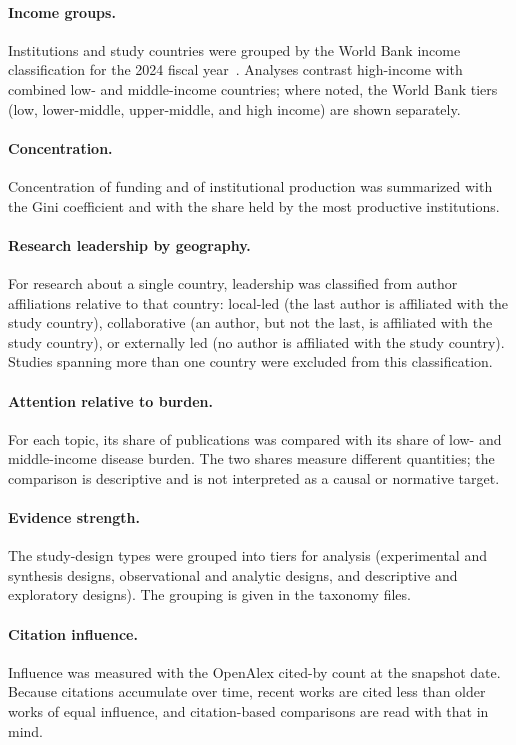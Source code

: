\paragraph{Income groups.}
Institutions and study countries were grouped by the World Bank income
classification for the 2024 fiscal year~\cite{worldbank2024}. Analyses contrast
high-income with combined low- and middle-income countries; where noted, the
World Bank tiers (low, lower-middle, upper-middle, and high income) are shown
separately.

\paragraph{Concentration.}
Concentration of funding and of institutional production was summarized with
the Gini coefficient and with the share held by the most productive
institutions.

\paragraph{Research leadership by geography.}
For research about a single country, leadership was classified from author
affiliations relative to that country: local-led (the last author is affiliated
with the study country), collaborative (an author, but not the last, is
affiliated with the study country), or externally led (no author is affiliated
with the study country). Studies spanning more than one country were excluded
from this classification.

\paragraph{Attention relative to burden.}
For each topic, its share of publications was compared with its share of low-
and middle-income disease burden. The two shares measure different quantities;
the comparison is descriptive and is not interpreted as a causal or normative
target.

\paragraph{Evidence strength.}
The study-design types were grouped into tiers for analysis (experimental and
synthesis designs, observational and analytic designs, and descriptive and
exploratory designs). The grouping is given in the taxonomy files.

\paragraph{Citation influence.}
Influence was measured with the OpenAlex cited-by count at the snapshot date.
Because citations accumulate over time, recent works are cited less than older
works of equal influence, and citation-based comparisons are read with that in
mind.

